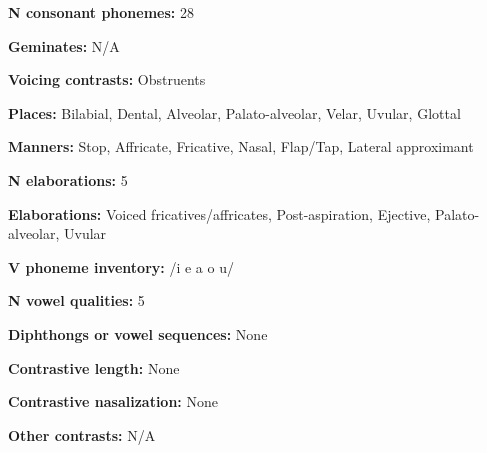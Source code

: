 \begin{styleBody}
\textbf{N consonant phonemes:} 28
\end{styleBody}

\begin{styleBody}
\textbf{Geminates:} N/A
\end{styleBody}

\begin{styleBody}
\textbf{Voicing contrasts:} Obstruents
\end{styleBody}

\begin{styleBody}
\textbf{Places:} Bilabial, Dental, Alveolar, Palato-alveolar, Velar, Uvular, Glottal
\end{styleBody}

\begin{styleBody}
\textbf{Manners:} Stop, Affricate, Fricative, Nasal, Flap/Tap, Lateral approximant
\end{styleBody}

\begin{styleBody}
\textbf{N elaborations:} 5
\end{styleBody}

\begin{styleBody}
\textbf{Elaborations:} Voiced fricatives/affricates, Post-aspiration, Ejective, Palato-alveolar, Uvular
\end{styleBody}

\begin{styleBody}
\textbf{V phoneme inventory:} /i e a o u/
\end{styleBody}

\begin{styleBody}
\textbf{N vowel qualities:} 5
\end{styleBody}

\begin{styleBody}
\textbf{Diphthongs or vowel sequences:} None
\end{styleBody}

\begin{styleBody}
\textbf{Contrastive length:} None
\end{styleBody}

\begin{styleBody}
\textbf{Contrastive nasalization:} None
\end{styleBody}

\begin{styleBody}
\textbf{Other contrasts:} N/A
\end{styleBody}

